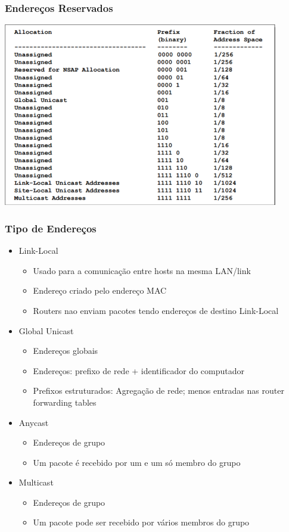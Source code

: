 \documentclass{article}
\begin{document}
\subsubsection{Endereços Reservados}
\begin{center}
    \includegraphics[width=12cm]{images/RCOM35.png}
\end{center}

\subsubsection{Tipo de Endereços}
\begin{itemize}
    \item Link-Local
    \begin{itemize}
        \item Usado para a comunicação entre hosts na mesma LAN/link
        \item Endereço criado pelo endereço MAC
        \item Routers nao enviam pacotes tendo endereços de destino Link-Local
    \end{itemize}
    \item Global Unicast
    \begin{itemize}
        \item Endereços globais
        \item Endereços: prefixo de rede + identificador do computador
        \item Prefixos estruturados: Agregação de rede; menos entradas nas router forwarding tables
    \end{itemize}
    \item Anycast
    \begin{itemize}
        \item Endereços de grupo
        \item Um pacote é recebido por um e um só membro do grupo
    \end{itemize}
    \item Multicast
    \begin{itemize}
        \item Endereços de grupo
        \item Um pacote pode ser recebido por vários membros do grupo
    \end{itemize}
\end{itemize}
\end{document}
